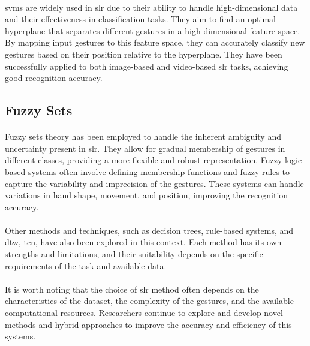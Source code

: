 \paragraph{}
\ac{svm}s are widely used in \ac{slr} due to their ability to handle high-dimensional data and their effectiveness in classification tasks. They aim to find an optimal hyperplane that separates different gestures in a high-dimensional feature space. By mapping input gestures to this feature space, they can accurately classify new gestures based on their position relative to the hyperplane. They have been successfully applied to both image-based and video-based \ac{slr} tasks, achieving good recognition accuracy.

\subsection{Fuzzy Sets}
\paragraph{}
Fuzzy sets theory has been employed to handle the inherent ambiguity and uncertainty present in \ac{slr}. They allow for gradual membership of gestures in different classes, providing a more flexible and robust representation. Fuzzy logic-based systems often involve defining membership functions and fuzzy rules to capture the variability and imprecision of the gestures. These systems can handle variations in hand shape, movement, and position, improving the recognition accuracy.

\paragraph{}
Other methods and techniques, such as decision trees, rule-based systems, and \ac{dtw}, \ac{tcn}, have also been explored in this context. Each method has its own strengths and limitations, and their suitability depends on the specific requirements of the task and available data.
\paragraph{}
It is worth noting that the choice of \ac{slr} method often depends on the characteristics of the dataset, the complexity of the gestures, and the available computational resources. Researchers continue to explore and develop novel methods and hybrid approaches to improve the accuracy and efficiency of this systems.
